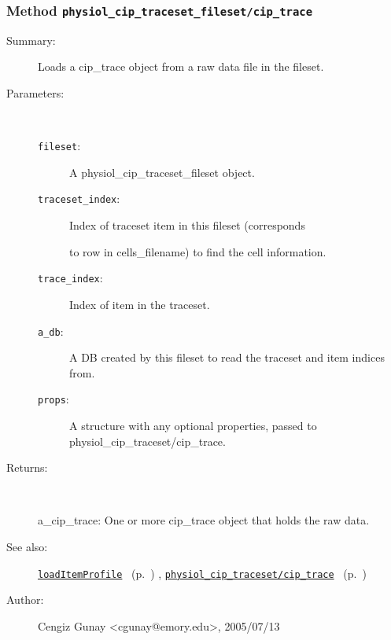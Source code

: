 \subsubsection[Method \texttt{cip\_trace}]{Method \texttt{physiol\_cip\_traceset\_fileset/cip\_trace}}%
%
\label{ref_physiol_cip_traceset_fileset__cip_trace}%
\hypertarget{ref_physiol_cip_traceset_fileset__cip_trace}{}%
\begin{description}
\item[Summary:]Loads a cip\_trace object from a raw data file in the fileset.
%
%
%
\item[Parameters:]~
\begin{description}%
\item[\texttt{fileset}:]
 A physiol\_cip\_traceset\_fileset object.
\item[\texttt{traceset\_index}:]
 Index of traceset item in this fileset (corresponds 

to row in cells\_filename) to find the cell information.\item[\texttt{trace\_index}:]
 Index of item in the traceset.
\item[\texttt{a\_db}:]
 A DB created by this fileset to read the traceset and item indices from.
\item[\texttt{props}:]
 A structure with any optional properties, passed to physiol\_cip\_traceset/cip\_trace.
\end{description}%
%
\item[Returns:]~

	a\_cip\_trace: One or more cip\_trace object that holds the raw data.
%
%
\item[See also:]%
\hyperlink{ref_loadItemProfile}{\texttt{loadItemProfile}}%
\ (p.~\pageref{ref_loadItemProfile})%
%
, \hyperlink{ref_physiol_cip_traceset__cip_trace}{\texttt{physiol\_cip\_traceset/cip\_trace}}%
\ (p.~\pageref{ref_physiol_cip_traceset__cip_trace})%
%
%
\item[Author:]%
Cengiz Gunay <cgunay@emory.edu>, 2005/07/13%
\end{description}
\methodline%
